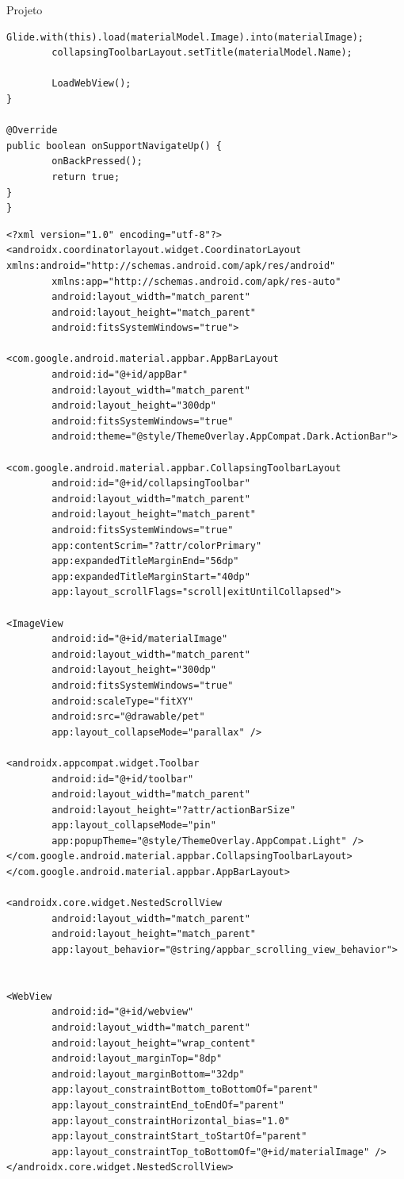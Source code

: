 \documentclass[
	12pt,				%
	openright,			%
	twoside,			%
	a4paper,			%
	english,			%
	french,				%
	spanish,			%
	brazil				%
	]{abntex2}
\begin{document}
\begin{chapter}{Projeto}
\begin{lstlisting}[numbers=none,basicstyle=\small,
caption={ActivityMaterialDetails.java},
title={ActivityMaterialDetails.java},
label={ActivityMaterialDetails.java}]
		Glide.with(this).load(materialModel.Image).into(materialImage);
		collapsingToolbarLayout.setTitle(materialModel.Name);

		LoadWebView();
}

@Override
public boolean onSupportNavigateUp() {
		onBackPressed();
		return true;
}
}
\end{lstlisting}

\begin{lstlisting}[numbers=none,basicstyle=\small,
caption={ActivityMaterialDetails.xml},
title={ActivityMaterialDetails.xml},
label={ActivityMaterialDetails.xml}]
<?xml version="1.0" encoding="utf-8"?>
<androidx.coordinatorlayout.widget.CoordinatorLayout	xmlns:android="http://schemas.android.com/apk/res/android"
		xmlns:app="http://schemas.android.com/apk/res-auto"
		android:layout_width="match_parent"
		android:layout_height="match_parent"
		android:fitsSystemWindows="true">

<com.google.android.material.appbar.AppBarLayout
		android:id="@+id/appBar"
		android:layout_width="match_parent"
		android:layout_height="300dp"
		android:fitsSystemWindows="true"
		android:theme="@style/ThemeOverlay.AppCompat.Dark.ActionBar">

<com.google.android.material.appbar.CollapsingToolbarLayout
		android:id="@+id/collapsingToolbar"
		android:layout_width="match_parent"
		android:layout_height="match_parent"
		android:fitsSystemWindows="true"
		app:contentScrim="?attr/colorPrimary"
		app:expandedTitleMarginEnd="56dp"
		app:expandedTitleMarginStart="40dp"
		app:layout_scrollFlags="scroll|exitUntilCollapsed">

<ImageView
		android:id="@+id/materialImage"
		android:layout_width="match_parent"
		android:layout_height="300dp"
		android:fitsSystemWindows="true"
		android:scaleType="fitXY"
		android:src="@drawable/pet"
		app:layout_collapseMode="parallax" />

<androidx.appcompat.widget.Toolbar
		android:id="@+id/toolbar"
		android:layout_width="match_parent"
		android:layout_height="?attr/actionBarSize"
		app:layout_collapseMode="pin"
		app:popupTheme="@style/ThemeOverlay.AppCompat.Light" />
</com.google.android.material.appbar.CollapsingToolbarLayout>
</com.google.android.material.appbar.AppBarLayout>

<androidx.core.widget.NestedScrollView
		android:layout_width="match_parent"
		android:layout_height="match_parent"
		app:layout_behavior="@string/appbar_scrolling_view_behavior">


<WebView
		android:id="@+id/webview"
		android:layout_width="match_parent"
		android:layout_height="wrap_content"
		android:layout_marginTop="8dp"
		android:layout_marginBottom="32dp"
		app:layout_constraintBottom_toBottomOf="parent"
		app:layout_constraintEnd_toEndOf="parent"
		app:layout_constraintHorizontal_bias="1.0"
		app:layout_constraintStart_toStartOf="parent"
		app:layout_constraintTop_toBottomOf="@+id/materialImage" />
</androidx.core.widget.NestedScrollView>


\end{lstlisting}
\end{chapter}
\end{document}
